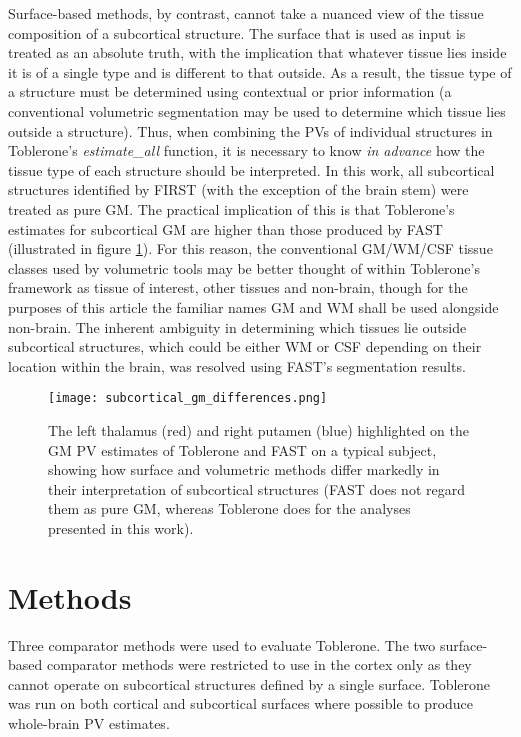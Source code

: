 Surface-based methods, by contrast, cannot take a nuanced view of the tissue composition of a subcortical structure. The surface that is used as input is treated as an absolute truth, with the implication that whatever tissue lies inside it is of a single type and is different to that outside. As a result, the tissue type of a structure must be determined using contextual or prior information (a conventional volumetric segmentation may be used to determine which tissue lies outside a structure). Thus, when combining the PVs of individual structures in Toblerone’s \textit{estimate\_all} function, it is necessary to know \textit{in advance} how the tissue type of each structure should be interpreted. In this work, all subcortical structures identified by FIRST (with the exception of the brain stem) were treated as pure GM. The practical implication of this is that Toblerone’s estimates for subcortical GM are higher than those produced by FAST (illustrated in figure \ref{subcortical_gm_differences}). For this reason, the conventional GM/WM/CSF tissue classes used by volumetric tools may be better thought of within Toblerone’s framework as tissue of interest, other tissues and non-brain, though for the purposes of this article the familiar names GM and WM shall be used alongside non-brain. The inherent ambiguity in determining which tissues lie outside subcortical structures, which could be either WM or CSF depending on their location within the brain, was resolved using FAST’s segmentation results.

\begin{figure}[H]
\centering
\texttt{[image: subcortical\_gm\_differences.png]}
\caption{The left thalamus (red) and right putamen (blue) highlighted on the GM PV estimates of Toblerone and FAST on a typical subject, showing how surface and volumetric methods differ markedly in their interpretation of subcortical structures (FAST does not regard them as pure GM, whereas Toblerone does for the analyses presented in this work).}
\label{subcortical_gm_differences}
\end{figure}

\section{Methods}

\label{tob_pv_evaluation}

Three comparator methods were used to evaluate Toblerone. The two surface-based comparator methods were restricted to use in the cortex only as they cannot operate on subcortical structures defined by a single surface. Toblerone was run on both cortical and subcortical surfaces where possible to produce whole-brain PV estimates. 

